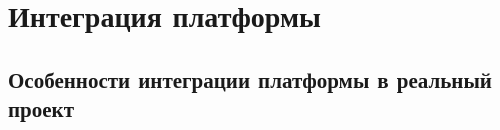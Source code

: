 \section{Интеграция платформы}

\subsection{Особенности интеграции платформы в реальный проект}


\pagebreak